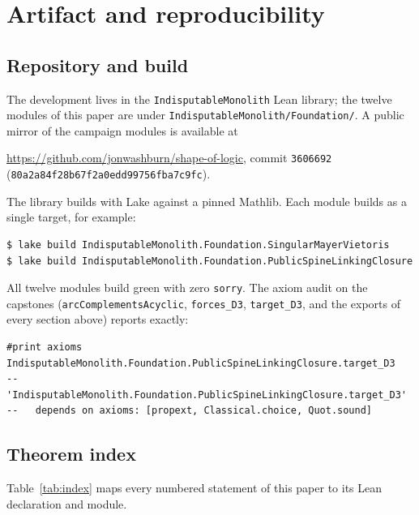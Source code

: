\documentclass[11pt]{article}
\theoremstyle{remark}
\newcommand{\leanname}[1]{\texttt{#1}}
\begin{document}
\section{Artifact and reproducibility}\label{sec:artifact}

\subsection{Repository and build}

The development lives in the \texttt{IndisputableMonolith} Lean library;
the twelve modules of this paper are under
\texttt{IndisputableMonolith/Foundation/}. A public mirror of the campaign
modules is available at
\begin{center}
\url{https://github.com/jonwashburn/shape-of-logic},
commit \texttt{3606692}\,(\texttt{80a2a84f28b67f2a0edd99756fba7c9fc}).
\end{center}
The library builds with Lake against a pinned Mathlib. Each module builds as
a single target, for example:

\begin{lstlisting}[language={}]
$ lake build IndisputableMonolith.Foundation.SingularMayerVietoris
$ lake build IndisputableMonolith.Foundation.PublicSpineLinkingClosure
\end{lstlisting}

All twelve modules build green with zero \texttt{sorry}. The axiom audit on
the capstones (\leanname{arcComplementsAcyclic}, \leanname{forces\_D3},
\leanname{target\_D3}, and the exports of every section above) reports
exactly:

\begin{lstlisting}[language={}]
#print axioms IndisputableMonolith.Foundation.PublicSpineLinkingClosure.target_D3
-- 'IndisputableMonolith.Foundation.PublicSpineLinkingClosure.target_D3'
--   depends on axioms: [propext, Classical.choice, Quot.sound]
\end{lstlisting}

\subsection{Theorem index}

Table~\ref{tab:index} maps every numbered statement of this paper to its
Lean declaration and module.
\end{document}
